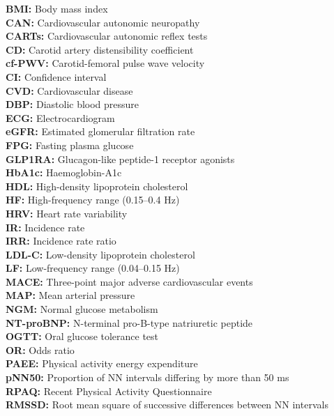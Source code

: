 \documentclass[
  a4paper,
  headsepline=true,
  open=any]{scrbook}
\begin{document}
\textbf{BMI:} Body mass index\\
\textbf{CAN:} Cardiovascular autonomic neuropathy\\
\textbf{CARTs:} Cardiovascular autonomic reflex tests\\
\textbf{CD:} Carotid artery distensibility coefficient\\
\textbf{cf-PWV:} Carotid-femoral pulse wave velocity\\
\textbf{CI:} Confidence interval\\
\textbf{CVD:} Cardiovascular disease\\
\textbf{DBP:} Diastolic blood pressure\\
\textbf{ECG:} Electrocardiogram\\
\textbf{eGFR:} Estimated glomerular filtration rate\\
\textbf{FPG:} Fasting plasma glucose\\
\textbf{GLP1RA:} Glucagon-like peptide-1 receptor agonists\\
\textbf{HbA1c:} Haemoglobin-A1c\\
\textbf{HDL:} High-density lipoprotein cholesterol\\
\textbf{HF:} High-frequency range (0.15--0.4 Hz)\\
\textbf{HRV:} Heart rate variability\\
\textbf{IR:} Incidence rate\\
\textbf{IRR:} Incidence rate ratio\\
\textbf{LDL-C:} Low-density lipoprotein cholesterol\\
\textbf{LF:} Low-frequency range (0.04--0.15 Hz)\\
\textbf{MACE:} Three-point major adverse cardiovascular events\\
\textbf{MAP:} Mean arterial pressure\\
\textbf{NGM:} Normal glucose metabolism\\
\textbf{NT-proBNP:} N-terminal pro-B-type natriuretic peptide\\
\textbf{OGTT:} Oral glucose tolerance test\\
\textbf{OR:} Odds ratio\\
\textbf{PAEE:} Physical activity energy expenditure\\
\textbf{pNN50:} Proportion of NN intervals differing by more than 50
ms\\
\textbf{RPAQ:} Recent Physical Activity Questionnaire\\
\textbf{RMSSD:} Root mean square of successive differences between NN
intervals\\
\end{document}
